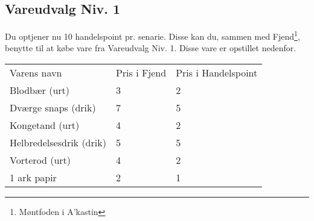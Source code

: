\subsection{Vareudvalg Niv. 1}
Du optjener nu 10 handelspoint pr. senarie. Disse kan du, sammen med Fjend\footnote{Møntfoden i A'kastin}, benytte til at købe vare fra Vareudvalg Niv. 1. Disse vare er opstillet nedenfor.
\begin{table}[H]
    \centering
    \begin{tabular}{|p{}|p{}|p{}|}
    \hline
    \rowcolor{cerulean!80}
    \multicolumn{3}{c}{Vareudvalg Niv. 1}\\
    \hline
    \rowcolor{cerulean!40}
         Varens navn & Pris i Fjend & Pris i Handelspoint \\\hline
         Blodbær (urt) & 3 & 2\\\hline
         Dværge snaps (drik) & 7 & 5\\\hline
         Kongetand (urt) & 4 & 2\\\hline
         Helbredelsesdrik (drik) & 5 & 5\\\hline
         Vorterod (urt) & 4 & 2\\\hline
         1 ark papir & 2 & 1\\\hline
    \end{tabular}
    \end{table}